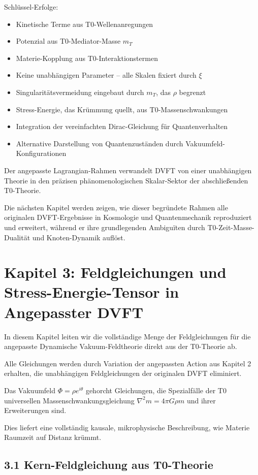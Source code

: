	Schlüssel-Erfolge:
	\begin{itemize}
		\item Kinetische Terme aus T0-Wellenanregungen
		\item Potenzial aus T0-Mediator-Masse $m_T$
		\item Materie-Kopplung aus T0-Interaktionstermen
		\item Keine unabhängigen Parameter – alle Skalen fixiert durch $\xi$
		\item Singularitätsvermeidung eingebaut durch $m_T$, das $\rho$ begrenzt
		\item Stress-Energie, das Krümmung quellt, aus T0-Massenschwankungen
		\item Integration der vereinfachten Dirac-Gleichung für Quantenverhalten
		\item Alternative Darstellung von Quantenzuständen durch Vakuumfeld-Konfigurationen
	\end{itemize}
	
	Der angepasste Lagrangian-Rahmen verwandelt DVFT von einer unabhängigen Theorie in den präzisen phänomenologischen Skalar-Sektor der abschließenden T0-Theorie.
	
	Die nächsten Kapitel werden zeigen, wie dieser begründete Rahmen alle originalen DVFT-Ergebnisse in Kosmologie und Quantenmechanik reproduziert und erweitert, während er ihre grundlegenden Ambiguïten durch T0-Zeit-Masse-Dualität und Knoten-Dynamik auflöst.
	
	\section{Kapitel 3: Feldgleichungen und Stress-Energie-Tensor in Angepasster DVFT}
	
	In diesem Kapitel leiten wir die vollständige Menge der Feldgleichungen für die angepasste Dynamische Vakuum-Feldtheorie direkt aus der T0-Theorie ab.
	
	Alle Gleichungen werden durch Variation der angepassten Action aus Kapitel 2 erhalten, die unabhängigen Feldgleichungen der originalen DVFT eliminiert.
	
	Das Vakuumfeld $\Phi = \rho e^{i\theta}$ gehorcht Gleichungen, die Spezialfälle der T0 universellen Massenschwankungsgleichung $\nabla^2 m = 4\pi G \rho m$ und ihrer Erweiterungen sind.
	
	Dies liefert eine vollständig kausale, mikrophysische Beschreibung, wie Materie Raumzeit auf Distanz krümmt.
	
	\subsection{3.1 Kern-Feldgleichung aus T0-Theorie}
	
